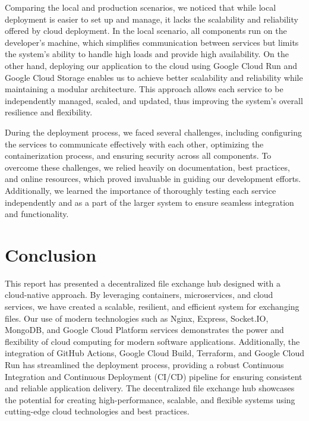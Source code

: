 \documentclass[a4paper,fleqn]{cas-dc}
\begin{document}
Comparing the local and production scenarios, we noticed that while local deployment is easier to set up and manage, it lacks the scalability and reliability offered by cloud deployment. In the local scenario, all components run on the developer's machine, which simplifies communication between services but limits the system's ability to handle high loads and provide high availability. On the other hand, deploying our application to the cloud using Google Cloud Run and Google Cloud Storage enables us to achieve better scalability and reliability while maintaining a modular architecture. This approach allows each service to be independently managed, scaled, and updated, thus improving the system's overall resilience and flexibility.

During the deployment process, we faced several challenges, including configuring the services to communicate effectively with each other, optimizing the containerization process, and ensuring security across all components. To overcome these challenges, we relied heavily on documentation, best practices, and online resources, which proved invaluable in guiding our development efforts. Additionally, we learned the importance of thoroughly testing each service independently and as a part of the larger system to ensure seamless integration and functionality.

\section{Conclusion}

This report has presented a decentralized file exchange hub designed with a cloud-native approach. By leveraging containers, microservices, and cloud services, we have created a scalable, resilient, and efficient system for exchanging files. Our use of modern technologies such as Nginx, Express, Socket.IO, MongoDB, and Google Cloud Platform services demonstrates the power and flexibility of cloud computing for modern software applications. Additionally, the integration of GitHub Actions, Google Cloud Build, Terraform, and Google Cloud Run has streamlined the deployment process, providing a robust Continuous Integration and Continuous Deployment (CI/CD) pipeline for ensuring consistent and reliable application delivery. The decentralized file exchange hub showcases the potential for creating high-performance, scalable, and flexible systems using cutting-edge cloud technologies and best practices.

%
%
%


\end{document}
